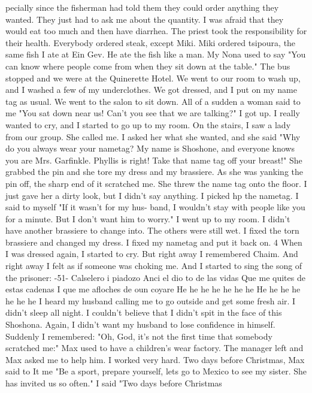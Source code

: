 pecially since the fisherman had told them they could order anything they 
wanted. They just had to ask me about the quantity. I was afraid that 
they would eat too much and then have diarrhea. The priest took the responsibility for their health. 
Everybody ordered steak, except Miki. Miki ordered tsipoura, the same 
fish I ate at Ein Gev. He ate the fish like a man. My Nona used to say 
"You can know where people come from when they sit down at the table." 
The bus stopped and we were at the Quinerette Hotel. We went to our 
room to wash up, and I washed a few of my underclothes. We got dressed, 
and I put on my name tag as usual. We went to the salon to sit down. All of 
a sudden a woman said to me "You sat down near us! Can't you see that we 
are talking?" I got up. I really wanted to cry, and I started to go up to 
my room. On the stairs, I saw a lady from our group. She called me. I 
asked her what she wanted, and she said "Why do you always wear your nametag? My name is Shoshone, and everyone knows you are Mrs. Garfinkle. 
Phyllis is right! Take that name tag off your breast!" She grabbed the pin 
and she tore my dress and my brassiere. As she was yanking the pin off, 
the sharp end of it scratched me. She threw the name tag onto the floor. I 
just gave her a dirty look, but I didn't say anything. 
I picked hp the nametag. I said to myself "If it wasn't for my hus-
band, I wouldn't stay with people like you for a minute. But I don't want 
him to worry." I went up to my room. I didn't have another brassiere to 
change into. The others were still wet. I fixed the torn brassiere and 
changed my dress. I fixed my nametag and put it back on. 
4 
When I was dressed again, I started to cry. But right away I remembered 
Chaim. And right away I felt as if someone was choking me. And I started 
to sing the song of the prisoner: 
-51- 
Calselero i piadozo 
Anci el dio to de las vidas 
Que me quites de estas cadenas 
I que me afloches de oun coyare 
He he he he he he he 
He he he he he he he 
I heard my husband calling me to go outside and get some fresh air. 
I didn't sleep all night. I couldn't believe that I didn't spit in the 
face of this Shoshona. Again, I didn't want my husband to lose confidence 
in himself. Suddenly I remembered: "Oh, God, it's not the first time that 
somebody scratched me:" 
Max used to have a children's wear factory. The manager left and Max 
 asked me to help him. I worked very hard. Two days before Christmas, Max 
said to It me "Be a sport, prepare yourself, lets go to Mexico to see my 
sister. She has invited us so often." I said "Two days before Christmas 
